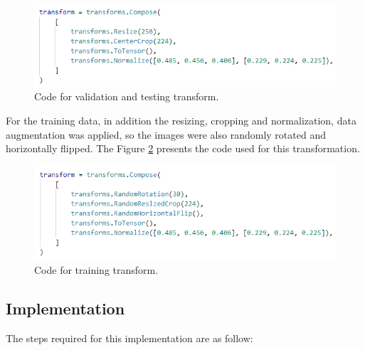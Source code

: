 \documentclass{article}
\begin{document}
    \begin{figure}[htbp]
        \centering
        \includegraphics{img/transform_valid_test.png}
        \caption{Code for validation and testing transform.}
        \label{fig:transform_train_test}
    \end{figure}
    
    For the training data, in addition the resizing, cropping and normalization, data augmentation was applied, so the images were also randomly rotated and horizontally flipped. The Figure \ref*{fig:transform_train} presents the code used for this transformation.
    
    \begin{figure}[htbp]
        \centering
        \includegraphics{img/transform_train.png}
        \caption{Code for training transform.}
        \label{fig:transform_train}
    \end{figure}

    \subsection{Implementation}

    The steps required for this implementation are as follow:
\end{document}
